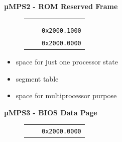 \documentclass{beamer}
\begin{document}
\begin{frame}
\begin{center}
\begin{minipage}{0.48\textwidth}
\begin{block}{\textbf{{\small µMPS2 - ROM Reserved Frame}}}
\begin{figure}[h]
\begin{tabular}{rcl}
						\multicolumn{1}{l|}{}                                                    & \multicolumn{1}{c|}{\cellcolor{nord13}}                                                      &                                               \\
						\multicolumn{1}{l|}{}                                                    & \multicolumn{1}{c|}{\cellcolor{nord13}}                                                      &                                               \\
						\multicolumn{1}{l|}{}                                                    & \multicolumn{1}{c|}{\cellcolor{nord13}}                                                      & \multirow{2}{*}{\texttt{{\tiny 0x2000.1000}}} \\ \hhline{~-~}
						\multicolumn{1}{l|}{}                                                    & \multicolumn{1}{c|}{\cellcolor{nord12}}                                                      &                                               \\
						\multicolumn{1}{l|}{}                                                    & \multicolumn{1}{c|}{\multirow{-2}{*}{\cellcolor{nord12}{\tiny \textit{ROM Reserved Frame}}}} & \multirow{2}{*}{\texttt{{\tiny 0x2000.0000}}} \\ \hhline{--~}
					\end{tabular}
				\end{figure}
				\begin{scriptsize}
					\begin{itemize}
						\item space for just one processor state
						\item segment table
						\item space for multiprocessor purpose
					\end{itemize}
				\end{scriptsize}
			\end{block}
		\end{minipage}
		\hspace{0pt plus 1 filll}
		\begin{minipage}{0.47\textwidth}
			\begin{block}{\textbf{{\small µMPS3 - BIOS Data Page}}}
				\begin{figure}[h]
					\centering
					\renewcommand{\arraystretch}{0.5}
					\begin{tabular}{rcl}
						                                                                         &                                                                                                & \multirow{2}{*}{\texttt{{\tiny 0x2000.0000}}} \\ \hhline{--~}

\end{tabular}
\end{figure}
\end{block}
\end{minipage}
\end{center}
\end{frame}
\end{document}
